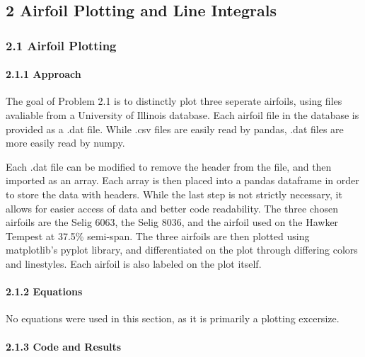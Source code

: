 \documentclass[11pt]{article}
\begin{document}
    \hypertarget{airfoil-plotting-and-line-integrals}{%
\subsection{2 \textbar{} Airfoil Plotting and Line
Integrals}\label{airfoil-plotting-and-line-integrals}}

\hypertarget{airfoil-plotting}{%
\subsubsection{2.1 \textbar{} Airfoil Plotting}\label{airfoil-plotting}}

\hypertarget{approach}{%
\paragraph{2.1.1 \textbar{} Approach}\label{approach}}

The goal of Problem 2.1 is to distinctly plot three seperate airfoils,
using files avaliable from a University of Illinois database. Each
airfoil file in the database is provided as a .dat file. While .csv
files are easily read by pandas, .dat files are more easily read by
numpy.

Each .dat file can be modified to remove the header from the file, and
then imported as an array. Each array is then placed into a pandas
dataframe in order to store the data with headers. While the last step
is not strictly necessary, it allows for easier access of data and
better code readability. The three chosen airfoils are the Selig 6063,
the Selig 8036, and the airfoil used on the Hawker Tempest at 37.5\%
semi-span. The three airfoils are then plotted using matplotlib's pyplot
library, and differentiated on the plot through differing colors and
linestyles. Each airfoil is also labeled on the plot itself.

\hypertarget{equations}{%
\paragraph{2.1.2 \textbar{} Equations}\label{equations}}

No equations were used in this section, as it is primarily a plotting
excersize.

\hypertarget{code-and-results}{%
\paragraph{2.1.3 \textbar{} Code and Results}\label{code-and-results}}
\end{document}
